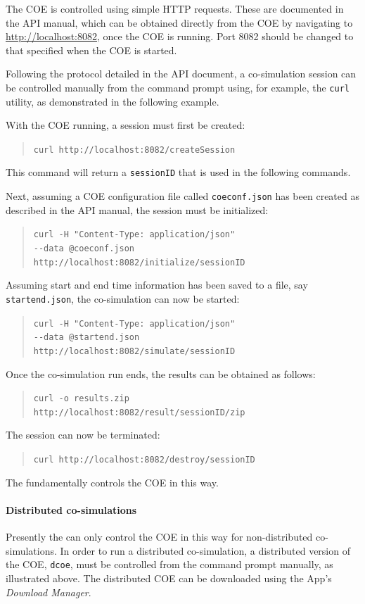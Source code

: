 The COE is controlled using simple HTTP requests.
%
These are documented in the API manual, which can be obtained directly from the COE by navigating to \url{http://localhost:8082}, once the COE is running.
%
Port 8082 should be changed to that specified when the COE is started.

Following the protocol detailed in the API document, a co-simulation session can be controlled manually from the command prompt using, for example, the \texttt{curl} utility, as demonstrated in the following example.

With the COE running, a session must first be created:
%
%
%
\begin{quote}
\texttt{curl http://localhost:8082/createSession}
\end{quote}
%
%
%
This command will return a \texttt{sessionID} that is used in the following commands.

Next, assuming a COE configuration file called \texttt{coeconf.json} has been created as described in the API manual, the session must be initialized:
%
%
%
\begin{quote}
\texttt{curl -H "Content-Type: application/json" \\ -{}-data @coeconf.json \\ http://localhost:8082/initialize/sessionID}
\end{quote}
%
%
%
Assuming start and end time information has been saved to a file, say \texttt{startend.json}, the co-simulation can now be started:
%
%
%
\begin{quote}
\texttt{curl -H "Content-Type: application/json" \\ -{}-data @startend.json \\ http://localhost:8082/simulate/sessionID}
\end{quote}
%
%
%
Once the co-simulation run ends, the results can be obtained as follows:
%
%
%
\begin{quote}
\texttt{curl -o results.zip \\ http://localhost:8082/result/sessionID/zip}
\end{quote}
%
%
%
The session can now be terminated:
%
%
%
\begin{quote}
\texttt{curl http://localhost:8082/destroy/sessionID}
\end{quote}
%
%
%
The \intoapp{} fundamentally controls the COE in this way.
%
\paragraph{Distributed co-simulations}
Presently the \intoapp{} can only control the COE in this way for non-distributed co-simulations.
%
In order to run a distributed co-si\-mu\-la\-tion, a distributed version of the COE, \texttt{dcoe}, must be controlled from the command prompt manually, as illustrated above.
%
The distributed COE can be downloaded using the App's \emph{Download Manager}.

